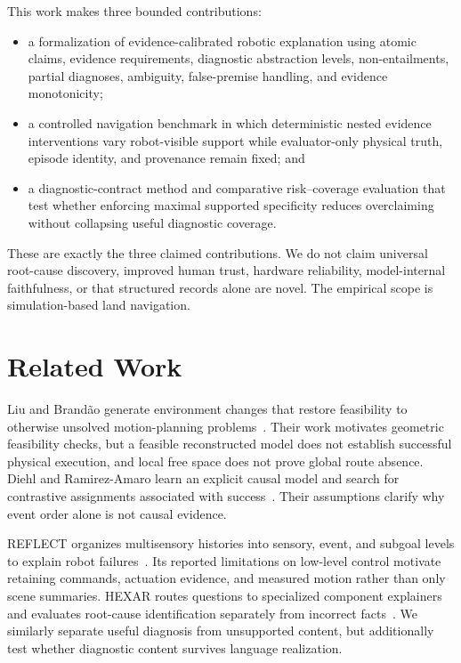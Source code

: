 \documentclass[conference]{IEEEtran}
\begin{document}
This work makes three bounded contributions:
\begin{itemize}
  \item a formalization of evidence-calibrated robotic explanation using atomic claims,
  evidence requirements, diagnostic abstraction levels, non-entailments, partial diagnoses,
  ambiguity, false-premise handling, and evidence monotonicity;
  \item a controlled navigation benchmark in which deterministic nested evidence interventions
  vary robot-visible support while evaluator-only physical truth, episode identity, and
  provenance remain fixed; and
  \item a diagnostic-contract method and comparative risk--coverage evaluation that test whether
  enforcing maximal supported specificity reduces overclaiming without collapsing useful
  diagnostic coverage.
\end{itemize}
These are exactly the three claimed contributions. We do not claim universal root-cause
discovery, improved human trust, hardware reliability, model-internal faithfulness, or that
structured records alone are novel. The empirical scope is simulation-based land navigation.

\section{Related Work}

Liu and Brand\~ao generate environment changes that restore feasibility to otherwise unsolved
motion-planning problems~\cite{liu2024environment}. Their work motivates geometric feasibility
checks, but a feasible reconstructed model does not establish successful physical execution, and
local free space does not prove global route absence. Diehl and Ramirez-Amaro learn an explicit
causal model and search for contrastive assignments associated with success~\cite{diehl2022fail}.
Their assumptions clarify why event order alone is not causal evidence.

REFLECT organizes multisensory histories into sensory, event, and subgoal levels to explain robot
failures~\cite{liu2023reflect}. Its reported limitations on low-level control motivate retaining
commands, actuation evidence, and measured motion rather than only scene summaries. HEXAR routes
questions to specialized component explainers and evaluates root-cause identification separately
from incorrect facts~\cite{love2026hexar}. We similarly separate useful diagnosis from unsupported
content, but additionally test whether diagnostic content survives language realization.
\end{document}
